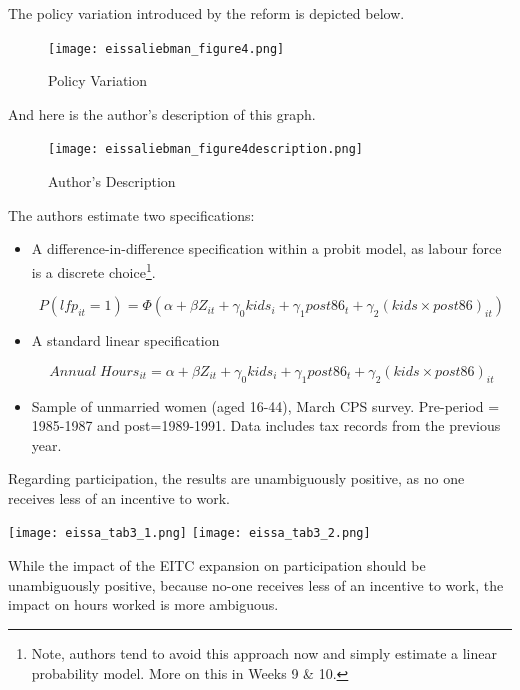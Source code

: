 \documentclass[
  letterpaper,
  DIV=11,
  numbers=noendperiod]{scrreprt}
\theoremstyle{definition}
\theoremstyle{remark}
\begin{document}
The policy variation introduced by the reform is depicted below.

\begin{figure}[H]

{\centering \texttt{[image: eissaliebman\_figure4.png]}

}

\caption{Policy Variation}

\end{figure}%

And here is the author's description of this graph.

\begin{figure}[H]

{\centering \texttt{[image: eissaliebman\_figure4description.png]}

}

\caption{Author's Description}

\end{figure}%

The authors estimate two specifications:

\begin{itemize}
\item
  A difference-in-difference specification within a probit model, as
  labour force is a discrete choice\footnote{Note, authors tend to avoid
    this approach now and simply estimate a linear probability model.
    More on this in Weeks 9 \& 10.}.

  \[P(lfp_{it}=1) = \Phi\left(\alpha + \beta Z_{it}+\gamma_0kids_i + \gamma_1post86_t+\gamma_2(kids\times post86)_{it}\right)\]
\item
  A standard linear specification

  \[Annual\;Hours_{it} = \alpha + \beta Z_{it}+\gamma_0kids_i + \gamma_1post86_t+\gamma_2(kids\times post86)_{it}\]
\item
  Sample of unmarried women (aged 16-44), March CPS survey. Pre-period =
  1985-1987 and post=1989-1991. Data includes tax records from the
  previous year.
\end{itemize}

Regarding participation, the results are unambiguously positive, as no
one receives less of an incentive to work.

\texttt{[image: eissa\_tab3\_1.png]}
\texttt{[image: eissa\_tab3\_2.png]}

While the impact of the EITC expansion on participation should be
unambiguously positive, because no-one receives less of an incentive to
work, the impact on hours worked is more ambiguous.
\end{document}
